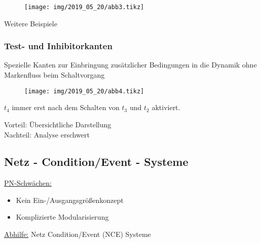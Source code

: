 \begin{figure}[H]
	\centering
	\texttt{[image: img/2019\_05\_20/abb3.tikz]}
\end{figure}

Weitere Beispiele 

\subsubsection{Test- und Inhibitorkanten}
Spezielle Kanten zur Einbringung zusätzlicher Bedingungen in die Dynamik ohne Markenfluss beim Schaltvorgang 

\begin{figure}[H]
	\centering
	\texttt{[image: img/2019\_05\_20/abb4.tikz]}
\end{figure}

$t_4$ immer erst nach dem Schalten von $t_3$ und $t_2$ aktiviert.

Vorteil: Übersichtliche Darstellung\\
Nachteil: Analyse erschwert



\subsection{Netz - Condition/Event - Systeme}
\underline{PN-Schwächen:}
\begin{itemize}
	\item Kein Ein-/Ausgangsgrößenkonzept
	\item Komplizierte Modularisierung
\end{itemize}

\underline{Abhilfe:} Netz Condition/Event (NCE) Systeme

